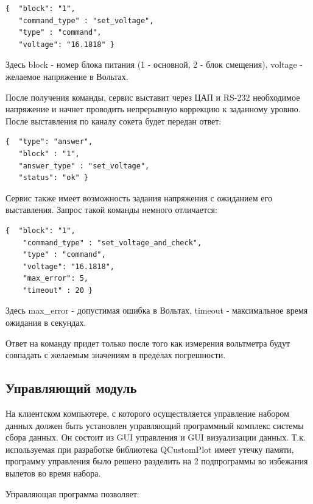 \documentclass[a4paper,14pt]{extreport}
\begin{document}
\begin{lstlisting}[caption={Команда на выставление напряжения спектрометра.}, captionpos=b]
{  "block": "1",
   "command_type" : "set_voltage",
   "type" : "command",
   "voltage": "16.1818" }
\end{lstlisting}
Здесь block - номер блока питания (1 - основной, 2 - блок смещения), voltage - желаемое напряжение в Вольтах.

После получения команды, сервис выставит через ЦАП и RS-232 необходимое напряжение и начнет проводить непрерывную коррекцию к заданному уровню. После выставления по каналу сокета будет передан ответ:

\begin{lstlisting}[caption={Сообщение об успешном выставлении напряжения на спектрометра.}, captionpos=b]
{  "type": "answer",
   "block" : "1",
   "answer_type" : "set_voltage",
   "status": "ok" }
\end{lstlisting}

Сервис также имеет возможность задания напряжения с ожиданием его выставления. Запрос такой команды немного отличается:

\begin{lstlisting}[caption={Команда на выставление напряжения спектрометра с последующей проверкой.}, captionpos=b]
 {  "block": "1",
    "command_type" : "set_voltage_and_check",
    "type" : "command",
    "voltage": "16.1818",
    "max_error": 5,
    "timeout" : 20 }
\end{lstlisting}
Здесь max\_error - допустимая ошибка в Вольтах, timeout - максимальное время ожидания в секундах.

Ответ на команду придет только после того как измерения вольтметра будут совпадать с желаемым значениям в пределах погрешности.

\subsection{Управляющий модуль}

На клиентском компьютере, с которого осуществляется управление набором данных должен быть установлен управляющий программный комплекс системы сбора данных. Он состоит из GUI управления и GUI визуализации данных. Т.к. используемая при разработке библиотека QCustomPlot имеет утечку памяти, программу управления было решено разделить на 2 подпрограммы во избежания вылетов во время набора.

Управляющая программа позволяет:
\end{document}
